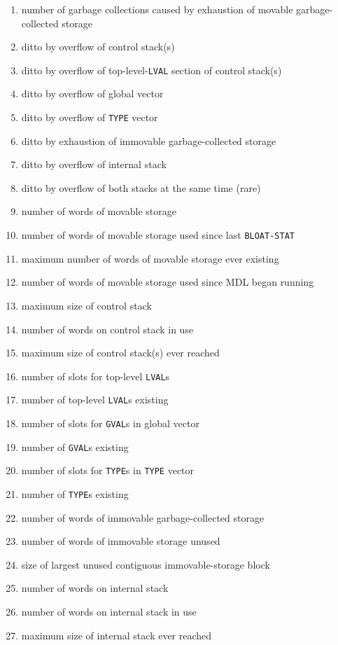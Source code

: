 \documentclass[a4paper,]{article}
\begin{document}
\begin{enumerate}
\def\labelenumi{\arabic{enumi}.}
\item
  number of garbage collections caused by exhaustion of movable garbage-collected storage
\item
  ditto by overflow of control stack(s)
\item
  ditto by overflow of top-level-\texttt{LVAL} section of control stack(s)
\item
  ditto by overflow of global vector
\item
  ditto by overflow of \texttt{TYPE} vector
\item
  ditto by exhaustion of immovable garbage-collected storage
\item
  ditto by overflow of internal stack
\item
  ditto by overflow of both stacks at the same time (rare)
\item
  number of words of movable storage
\item
  number of words of movable storage used since last \texttt{BLOAT-STAT}
\item
  maximum number of words of movable storage ever existing
\item
  number of words of movable storage used since MDL began running
\item
  maximum size of control stack
\item
  number of words on control stack in use
\item
  maximum size of control stack(s) ever reached
\item
  number of slots for top-level \texttt{LVAL}s
\item
  number of top-level \texttt{LVAL}s existing
\item
  number of slots for \texttt{GVAL}s in global vector
\item
  number of \texttt{GVAL}s existing
\item
  number of slots for \texttt{TYPE}s in \texttt{TYPE} vector
\item
  number of \texttt{TYPE}s existing
\item
  number of words of immovable garbage-collected storage
\item
  number of words of immovable storage unused
\item
  size of largest unused contiguous immovable-storage block
\item
  number of words on internal stack
\item
  number of words on internal stack in use
\item
  maximum size of internal stack ever reached
\end{enumerate}
\end{document}
